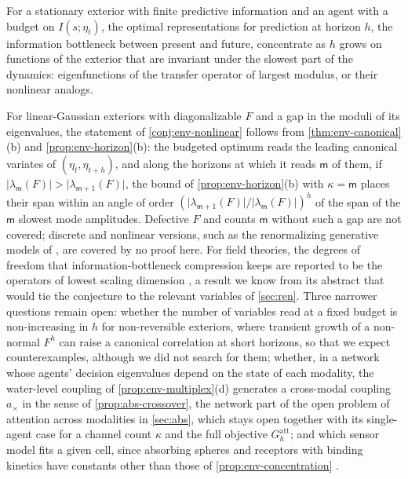 \begin{conjecture}\label{conj:env-nonlinear}
For a stationary exterior with finite predictive information and an agent with a budget on $I(s;\eta_t)$, the optimal representations for prediction at horizon $h$, the information bottleneck between present and future, concentrate as $h$ grows on functions of the exterior that are invariant under the slowest part of the dynamics: eigenfunctions of the transfer operator of largest modulus, or their nonlinear analogs.
\end{conjecture}

For linear-Gaussian exteriors with diagonalizable $F$ and a gap in the moduli of its eigenvalues, the statement of \cref{conj:env-nonlinear} follows from \cref{thm:env-canonical}(b) and \cref{prop:env-horizon}(b): the budgeted optimum reads the leading canonical variates of $(\eta_t,\eta_{t+h})$, and along the horizons at which it reads $\mathsf m$ of them, if $\lvert\lambda_{\mathsf m}(F)\rvert>\lvert\lambda_{\mathsf m+1}(F)\rvert$, the bound of \cref{prop:env-horizon}(b) with $\kappa=\mathsf m$ places their span within an angle of order $(\lvert\lambda_{\mathsf m+1}(F)\rvert/\lvert\lambda_{\mathsf m}(F)\rvert)^h$ of the span of the $\mathsf m$ slowest mode amplitudes. Defective $F$ and counts $\mathsf m$ without such a gap are not covered; discrete and nonlinear versions, such as the renormalizing generative models of \citet{friston2025pixels}, are covered by no proof here. For field theories, the degrees of freedom that information-bottleneck compression keeps are reported to be the operators of lowest scaling dimension \citep{gordon2021relevance}, a result we know from its abstract that would tie the conjecture to the relevant variables of \cref{sec:ren}. Three narrower questions remain open: whether the number of variables read at a fixed budget is non-increasing in $h$ for non-reversible exteriors, where transient growth of a non-normal $F^h$ can raise a canonical correlation at short horizons, so that we expect counterexamples, although we did not search for them; whether, in a network whose agents' decision eigenvalues depend on the state of each modality, the water-level coupling of \cref{prop:env-multiplex}(d) generates a cross-modal coupling $a_\times$ in the sense of \cref{prop:abs-crossover}, the network part of the open problem of attention across modalities in \cref{sec:abs}, which stays open together with its single-agent case for a channel count $\kappa$ and the full objective $G^{\mathrm{att}}_h$; and which sensor model fits a given cell, since absorbing spheres and receptors with binding kinetics have constants other than those of \cref{prop:env-concentration} \citep{bialek2005physical}.

